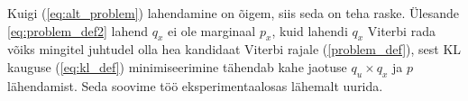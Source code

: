 Kuigi (\ref{eq:alt_problem}) lahendamine on õigem, siis seda on teha raske. Ülesande \ref{eq:problem_def2} lahend $q_x$ ei ole marginaal $p_x$, kuid lahendi $q_x$ Viterbi rada võiks mingitel juhtudel olla hea kandidaat Viterbi rajale (\ref{problem_def}), sest KL kauguse (\ref{eq:kl_def}) minimiseerimine tähendab kahe jaotuse $q_u \times q_x$ ja $p$ lähendamist. Seda soovime töö eksperimentaalosas lähemalt uurida.







